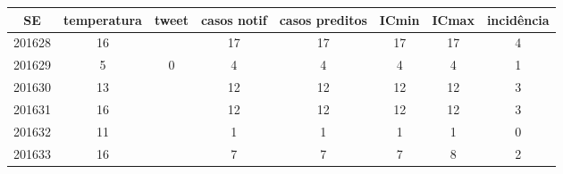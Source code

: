 \begin{tabular}{c|ccccccc}
  \hline
SE & temperatura & tweet & casos notif & casos preditos & ICmin & ICmax & incidência \\ 
  \hline
201628 & 16 &  & 17 & 17 & 17 & 17 & 4 \\ 
  201629 & 5 & 0 & 4 & 4 & 4 & 4 & 1 \\ 
  201630 & 13 &  & 12 & 12 & 12 & 12 & 3 \\ 
  201631 & 16 &  & 12 & 12 & 12 & 12 & 3 \\ 
  201632 & 11 &  & 1 & 1 & 1 & 1 & 0 \\ 
  201633 & 16 &  & 7 & 7 & 7 & 8 & 2 \\ 
   \hline
\end{tabular}
